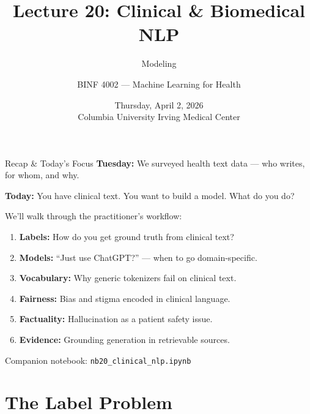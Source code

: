 \documentclass[aspectratio=169,11pt]{beamer}
\title{Lecture 20: Clinical \& Biomedical NLP}
\subtitle{Modeling}
\author{BINF 4002 --- Machine Learning for Health}
\date{Thursday, April 2, 2026\\[0.2em]{\small Columbia University Irving Medical Center}}
\institute{}
\begin{document}
\begin{frame}[noframenumbering]
\titlepage
\end{frame}

\begin{frame}{Recap \& Today's Focus}
\textbf{Tuesday:} We surveyed health text data --- who writes, for whom, and why.

\textbf{Today:} You have clinical text. You want to build a model. What do you do?

\vspace{0.2em}
\small We'll walk through the practitioner's workflow:
\begin{enumerate}\setlength\itemsep{0em}
  \item \textbf{Labels:} How do you get ground truth from clinical text?
  \item \textbf{Models:} ``Just use ChatGPT?'' --- when to go domain-specific.
  \item \textbf{Vocabulary:} Why generic tokenizers fail on clinical text.
  \item \textbf{Fairness:} Bias and stigma encoded in clinical language.
  \item \textbf{Factuality:} Hallucination as a patient safety issue.
  \item \textbf{Evidence:} Grounding generation in retrievable sources.
\end{enumerate}

{\small Companion notebook: \texttt{nb20\_clinical\_nlp.ipynb}}
\end{frame}



\section{The Label Problem}
\end{document}
